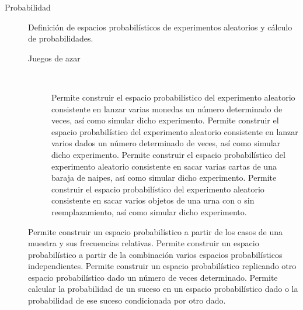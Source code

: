 \documentclass[10pt,twoside,spanish]{article}
\numberwithin{equation}{section}
\begin{document}
\begin{description}
\item[Probabilidad] Definición de espacios probabilísticos de experimentos aleatorios y cálculo de probabilidades. 
\begin{description}
\item[Juegos de azar] \hfill\\[-1\baselineskip] 
\begin{itemize}
 Permite construir el espacio probabilístico del experimento aleatorio consistente en lanzar varias monedas un número
determinado de veces, así como simular dicho experimento. 
  Permite construir el espacio probabilístico del experimento aleatorio consistente en lanzar varios dados un número
determinado de veces, así como simular dicho experimento. 
 Permite construir el espacio probabilístico del experimento aleatorio consistente en sacar varias cartas de una baraja de
naipes, así como simular dicho experimento. 
  Permite construir el espacio probabilístico del experimento aleatorio consistente en sacar varios objetos de una urna con o
sin reemplazamiento, así como simular dicho experimento.
\end{itemize}
\end{description}
\begin{itemize}
 Permite construir un espacio probabilístico a partir de los casos de una muestra y sus
frecuencias relativas. 
 Permite construir un espacio probabilístico a partir de la combinación varios espacios
probabilísticos independientes. 
 Permite construir un espacio probabilístico replicando otro espacio probabilístico dado un
número de veces determinado. 
 Permite calcular la probabilidad de un suceso en un espacio probabilístico dado o la probabilidad de ese
suceso condicionada por otro dado. 
\end{itemize}


\end{description}
\end{document}
